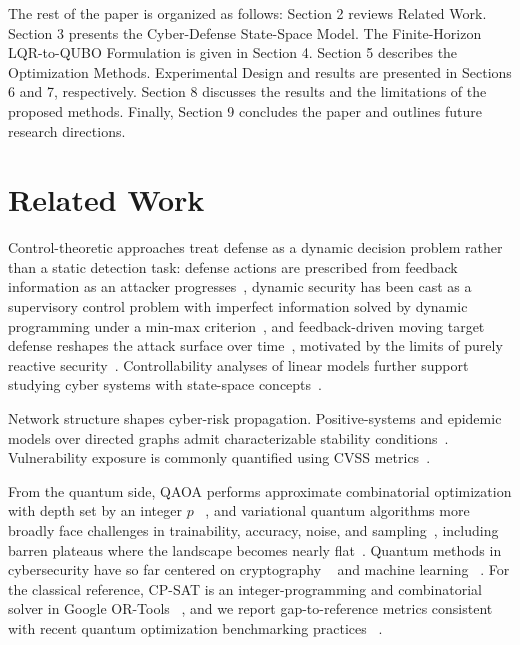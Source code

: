 \documentclass[runningheads]{llncs}
\begin{document}
The rest of the paper is organized as follows: Section 2 reviews Related Work. Section 3 presents the Cyber-Defense State-Space Model. The Finite-Horizon LQR-to-QUBO Formulation is given in Section 4. Section 5 describes the Optimization Methods. Experimental Design and results are presented in Sections 6 and 7, respectively. Section 8 discusses the results and the limitations of the proposed methods. Finally, Section 9 concludes the paper and outlines future research directions.

\section{Related Work}
\label{sec:related}

Control-theoretic approaches treat defense as a dynamic decision problem rather than a static detection task: defense actions are prescribed from feedback information as an attacker progresses~\cite{miehling2019control}, dynamic security has been cast as a supervisory control problem with imperfect information solved by dynamic programming under a min-max criterion~\cite{rasouli2014supervisory}, and feedback-driven moving target defense reshapes the attack surface over time~\cite{zhu2013game}, motivated by the limits of purely reactive security~\cite{zhang2025mtd}. Controllability analyses of linear models further support studying cyber systems with state-space concepts~\cite{astafieva2025optimal}.

Network structure shapes cyber-risk propagation. Positive-systems and epidemic models over directed graphs admit characterizable stability conditions~\cite{pirani2022survey}. Vulnerability exposure is commonly quantified using CVSS metrics~\cite{nistcvss,firstcvss}.

From the quantum side, QAOA performs approximate combinatorial optimization with depth set by an integer $p$ ~\cite{farhi2014qaoa}, and variational quantum algorithms more broadly face challenges in trainability, accuracy, noise, and sampling~\cite{cerezo2021variational}, including barren plateaus where the landscape becomes nearly flat~\cite{larocca2025barren}. Quantum methods in cybersecurity have so far centered on cryptography ~\cite{bennett1984quantum} and machine learning ~\cite{cherbal2024security}. For the classical reference, CP-SAT is an integer-programming and combinatorial solver in Google OR-Tools ~\cite{ortoolsdoc,perron2023cpsat}, and we report gap-to-reference metrics consistent with recent quantum optimization benchmarking practices ~\cite{lubinski2024optimization}.
\end{document}
